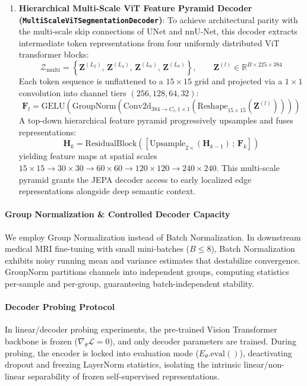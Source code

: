 \documentclass{article}
\begin{document}
\begin{enumerate}
    \item \textbf{Hierarchical Multi-Scale ViT Feature Pyramid Decoder (\texttt{MultiScaleViTSegmentationDecoder})}: To achieve architectural parity with the multi-scale skip connections of UNet and nnU-Net, this decoder extracts intermediate token representations from four uniformly distributed ViT transformer blocks:
    \begin{equation}
        \mathcal{Z}_{\text{multi}} = \left\{ \mathbf{Z}^{(L_2)}, \, \mathbf{Z}^{(L_4)}, \, \mathbf{Z}^{(L_6)}, \, \mathbf{Z}^{(L_8)} \right\}, \qquad \mathbf{Z}^{(l)} \in \mathbb{R}^{B \times 225 \times 384}
    \end{equation}
    Each token sequence is unflattened to a $15 \times 15$ grid and projected via a $1 \times 1$ convolution into channel tiers $(256, 128, 64, 32)$:
    \begin{equation}
        \mathbf{F}_l = \text{GELU}\left(\text{GroupNorm}\left(\text{Conv2d}_{384 \to C_l, 1\times 1}\left(\text{Reshape}_{15 \times 15}(\mathbf{Z}^{(l)})\right)\right)\right)
    \end{equation}
    A top-down hierarchical feature pyramid progressively upsamples and fuses representations:
    \begin{equation}
        \mathbf{H}_k = \text{ResidualBlock}\left(\left[ \text{Upsample}_{2\times}(\mathbf{H}_{k-1}) \,;\, \mathbf{F}_{k} \right]\right)
    \end{equation}
    yielding feature maps at spatial scales $15 \times 15 \to 30 \times 30 \to 60 \times 60 \to 120 \times 120 \to 240 \times 240$. This multi-scale pyramid grants the JEPA decoder access to early localized edge representations alongside deep semantic context.
\end{enumerate}

\paragraph{Group Normalization \& Controlled Decoder Capacity}
We employ Group Normalization \citep{wu2018group} instead of Batch Normalization. In downstream medical MRI fine-tuning with small mini-batches ($B \le 8$), Batch Normalization exhibits noisy running mean and variance estimates that destabilize convergence. GroupNorm partitions channels into independent groups, computing statistics per-sample and per-group, guaranteeing batch-independent stability.

\paragraph{Decoder Probing Protocol}
In linear/decoder probing experiments, the pre-trained Vision Transformer backbone is frozen ($\nabla_\theta \mathcal{L} = 0$), and only decoder parameters are trained. During probing, the encoder is locked into evaluation mode ($E_\theta.\text{eval}()$), deactivating dropout and freezing LayerNorm statistics, isolating the intrinsic linear/non-linear separability of frozen self-supervised representations.
\end{document}
